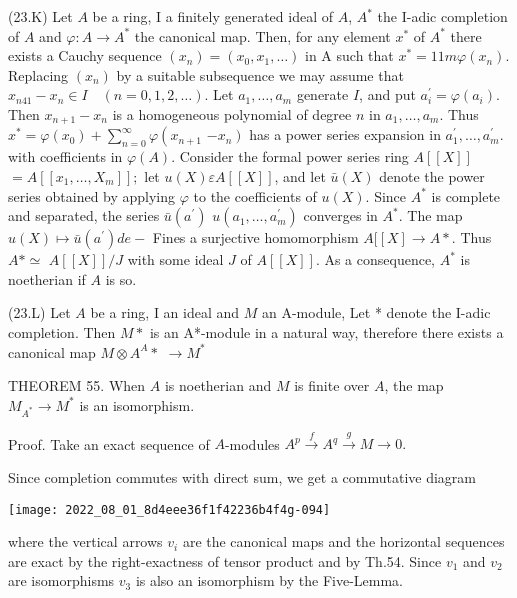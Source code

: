 (23.K) Let $A$ be a ring, I a finitely generated ideal of $A$, $A^{*}$ the I-adic completion of $A$ and $\varphi: A \rightarrow A^{*}$ the canonical map. Then, for any element $x^{*}$ of $A^{*}$ there exists a Cauchy sequence $\left(x_{n}\right)=\left(x_{0}, x_{1}, \ldots\right)$ in A such that $x^{*}=11 m \varphi\left(x_{n}\right)$. Replacing $\left(x_{n}\right)$ by a suitable subsequence we may assume that $x_{n 41}-x_{n} \in I \quad(n=0,1,2, \ldots)$. Let $a_{1}, \ldots, a_{m}$ generate $I$, and put $a_{i}^{\prime}=\varphi\left(a_{i}\right)$. Then $x_{n+1}-x_{n}$ is a homogeneous polynomial of degree $n$ in $a_{1}, \ldots, a_{m}$. Thus $x^{*}=\varphi\left(x_{0}\right)+\sum_{n=0}^{\infty} \varphi\left(x_{n+1}\right.$ $\left.-x_{n}\right)$ has a power series expansion in $a_{1}^{\prime}, \ldots, a_{m}^{\prime}$. with coefficients in $\varphi(A)$. Consider the formal power series ring $A[[X]]$ $=A\left[\left[x_{1}, \ldots, X_{m}\right]\right] ;$ let $u(X) \varepsilon A[[X]]$, and let $\bar{u}(X)$ denote the power series obtained by applying $\varphi$ to the coefficients of $u(X)$. Since $A^{*}$ is complete and separated, the series $\bar{u}\left(a^{\prime}\right)$ $u\left(a_{1}, \ldots, a_{m}^{\prime}\right)$ converges in $A^{*} .$ The map $u(X) \mapsto \bar{u}\left(a^{\prime}\right) d e-$ Fines a surjective homomorphism $A[[X] \rightarrow A *$. Thus $A * \simeq$ $A[[X]] / J$ with some ideal $J$ of $A[[X]]$. As a consequence, $A^{*}$ is noetherian if $A$ is so.

(23.L) Let $A$ be a ring, I an ideal and $M$ an A-module, Let * denote the I-adic completion. Then $M *$ is an A*-module in a natural way, therefore there exists a canonical map $M \otimes A^{A} *$ $\rightarrow M^{*}$

THEOREM 55. When $A$ is noetherian and $M$ is finite over $A$, the map $M_{A^{*}} \rightarrow M^{*}$ is an isomorphism.

Proof. Take an exact sequence of $A$-modules $A^{p} \stackrel{f}{\rightarrow} A^{q} \stackrel{g}{\rightarrow} M \rightarrow 0 .$

Since completion commutes with direct sum, we get a commutative diagram

\texttt{[image: 2022\_08\_01\_8d4eee36f1f42236b4f4g-094]}

where the vertical arrows $v_{i}$ are the canonical maps and the horizontal sequences are exact by the right-exactness of tensor product and by Th.54. Since $v_{1}$ and $v_{2}$ are isomorphisms $v_{3}$ is also an isomorphism by the Five-Lemma.

